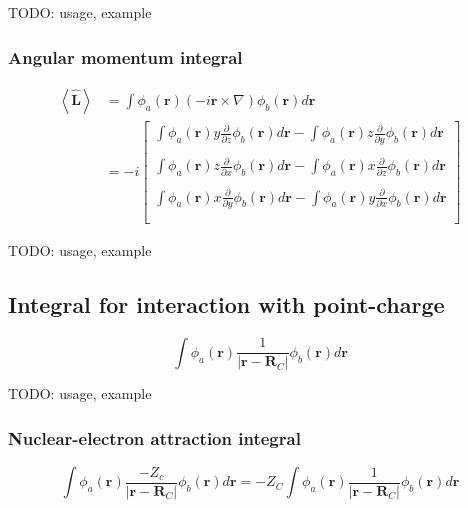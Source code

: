 \documentclass[letterpaper]{article}
\begin{document}
TODO: usage, example
\subsubsection{Angular momentum integral}
\begin{equation}
  \label{eq:angular_momentum}
  \begin{split}
    \left< \hat{\mathbf{L}} \right>
    &= \int \phi_a(\mathbf{r}) \left( -i \mathbf{r} \times \nabla \right) \phi_b(\mathbf{r}) d\mathbf{r}\\
    &= -i
    \begin{bmatrix}
      \int \phi_a(\mathbf{r}) y\frac{\partial}{\partial z} \phi_b(\mathbf{r}) d\mathbf{r}
      - \int \phi_a(\mathbf{r}) z\frac{\partial}{\partial y} \phi_b(\mathbf{r}) d\mathbf{r}\\\\
      \int \phi_a(\mathbf{r}) z\frac{\partial}{\partial x} \phi_b(\mathbf{r}) d\mathbf{r}
      - \int \phi_a(\mathbf{r}) x\frac{\partial}{\partial z} \phi_b(\mathbf{r}) d\mathbf{r}\\\\
      \int \phi_a(\mathbf{r}) x\frac{\partial}{\partial y} \phi_b(\mathbf{r}) d\mathbf{r}
      - \int \phi_a(\mathbf{r}) y\frac{\partial}{\partial x} \phi_b(\mathbf{r}) d\mathbf{r}\\\\
    \end{bmatrix}
  \end{split}
\end{equation}

TODO: usage, example
\subsection{Integral for interaction with point-charge}
\begin{equation}
  \label{eq:point_charge}
  \int \phi_a(\mathbf{r}) \frac{1}{|\mathbf{r} - \mathbf{R}_C|} \phi_b(\mathbf{r}) d\mathbf{r}
\end{equation}

TODO: usage, example
\subsubsection{Nuclear-electron attraction integral}
\begin{equation}
  \label{eq:nuclear_electron_attraction}
  \int \phi_a(\mathbf{r}) \frac{-Z_c}{|\mathbf{r} - \mathbf{R}_C|} \phi_b(\mathbf{r}) d\mathbf{r}
  =
  -Z_C \int \phi_a(\mathbf{r}) \frac{1}{|\mathbf{r} - \mathbf{R}_C|} \phi_b(\mathbf{r}) d\mathbf{r}
\end{equation}
\end{document}
